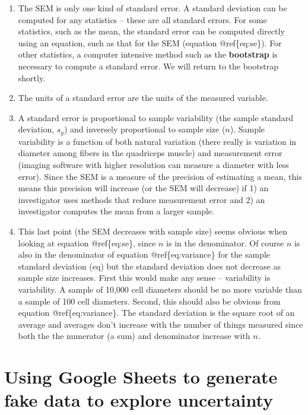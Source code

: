 \documentclass[]{book}
\providecommand{\tightlist}{%
  \setlength{\itemsep}{0pt}\setlength{\parskip}{0pt}}
\theoremstyle{definition}
\theoremstyle{definition}
\theoremstyle{definition}
\theoremstyle{remark}
\begin{document}
\begin{enumerate}
\def\labelenumi{\arabic{enumi}.}
\tightlist
\item
  The SEM is only one kind of standard error. A standard deviation can
  be computed for any statistics -- these are all standard errors. For
  some statistics, such as the mean, the standard error can be computed
  directly using an equation, such as that for the SEM (equation
  @ref\{eq:se\}). For other statistics, a computer intensive method such
  as the \textbf{bootstrap} is necessary to compute a standard error. We
  will return to the bootstrap shortly.
\item
  The units of a standard error are the units of the measured variable.
\item
  A standard error is proportional to sample variability (the sample
  standard deviation, \(s_y\)) and inversely proportional to sample size
  (\(n\)). Sample variability is a function of both natural variation
  (there really is variation in diameter among fibers in the quadriceps
  muscle) and measurement error (imaging software with higher resolution
  can measure a diameter with less error). Since the SEM is a measure of
  the precision of estimating a mean, this means this precision will
  increase (or the SEM will decrease) if 1) an investigator uses methods
  that reduce measurement error and 2) an investigator computes the mean
  from a larger sample.
\item
  This last point (the SEM decreases with sample size) seems obvious
  when looking at equation @ref\{eq:se\}, since \(n\) is in the
  denominator. Of course \(n\) is also in the denominator of equation
  @ref\{eq:variance\} for the sample standard deviation (eq) but the
  standard deviation does not decrease as sample size increases. First
  this would make any sense -- variability is variability. A sample of
  10,000 cell diameters should be no more variable than a sample of 100
  cell diameters. Second, this should also be obvious from equation
  @ref\{eq:variance\}. The standard deviation is the square root of an
  average and averages don't increase with the number of things measured
  since both the the numerator (a sum) and denominator increase with
  \(n\).
\end{enumerate}

\section{Using Google Sheets to generate fake data to explore
uncertainty}\label{using-google-sheets-to-generate-fake-data-to-explore-uncertainty}
\end{document}
